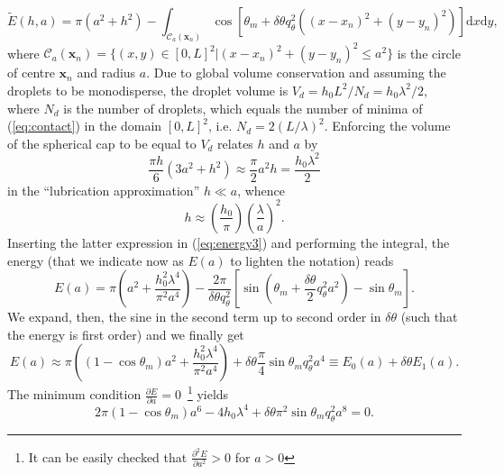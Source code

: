 \begin{equation}\label{eq:energy3}
  \tilde{E}(h,a) = \pi(a^2 + h^2) -
  \int_{\mathcal{C}_a(\mathbf{x}_n)} \cos\left[\theta_m + \delta \theta q_{\theta}^2 ((x-x_n)^2 + (y - y_n)^2)\right]
    \text{d}x\text{d}y,
\end{equation}  
where $\mathcal{C}_a(\mathbf{x}_n)=\{(x,y) \in [0, L]^2|(x-x_n)^2 + (y-y_n)^2 \leq a^2\}$ is the circle of centre $\mathbf{x}_n$ and radius $a$. 
Due to global volume conservation and assuming the droplets to be monodisperse, the droplet volume is $V_d = h_0L^2/N_d = h_0 \lambda^2/2$, where $N_d$ is the number of droplets, which equals the number of minima of (\ref{eq:contact}) in the domain $[0, L]^2$, i.e. $N_d = 2(L/\lambda)^2$.
Enforcing the volume of the spherical cap to be equal to $V_d$ relates $h$ and $a$ by
\begin{equation}
  \frac{\pi h}{6}(3a^2 + h^2) \approx \frac{\pi}{2} a^2 h =  \frac{h_0 \lambda^2}{2}    
\end{equation}
in the ``lubrication approximation'' $h \ll a$, whence
\begin{equation}
  h \approx \left(\frac{h_0}{\pi}\right) \left(\frac{\lambda}{a}\right)^2.
\end{equation}  
Inserting the latter expression in (\ref{eq:energy3}) and performing the integral, the energy (that we indicate now as $E(a)$ to lighten the notation) reads
\begin{equation}\label{eq:energy4}
  E(a) = \pi \left(a^2 + \frac{h_0^2 \lambda^4}{\pi^2 a^4} \right) - \frac{2\pi}{\delta \theta q_{\theta}^2}
  \left[\sin\left(\theta_m +\frac{\delta \theta}{2}q_{\theta}^2a^2\right) - \sin \theta_m \right].
\end{equation}  
We expand, then, the sine in the second term up to second order in $\delta \theta$ (such that the energy is first order) and we finally get
\begin{equation}\label{eq:energyfin}
  E(a) \approx  \pi \left((1-\cos \theta_m) a^2 + \frac{h_0^2 \lambda^4}{\pi^2 a^4} \right)
  + \delta \theta \frac{\pi}{4}\sin \theta_m q_{\theta}^2 a^4 \equiv E_0(a) + \delta \theta E_1(a).
\end{equation}  
The minimum condition $\frac{\partial E}{\partial a} = 0$~\footnote{It can be easily checked that $\frac{\partial^2 E}{\partial a^2} > 0$ for $a>0$} yields
\begin{equation}\label{eq:minim}
  2\pi (1-\cos \theta_m)a^6 - 4h_0 \lambda^4 + \delta \theta \pi^2 \sin \theta_m q_{\theta}^2 a^8 =0.
\end{equation}  
